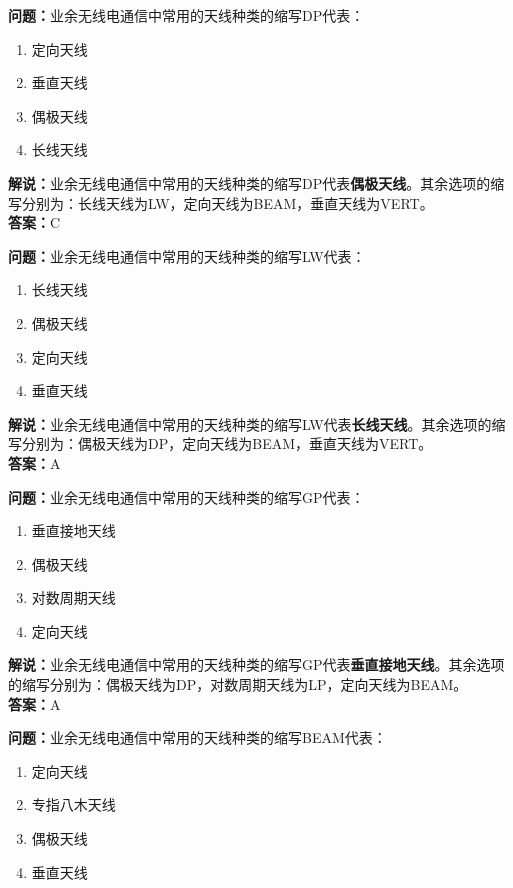 \bigskip


\noindent\textbf{问题：}业余无线电通信中常用的天线种类的缩写DP代表：
\begin{enumerate}[label=\Alph*), leftmargin=3em]
\item 定向天线
\item 垂直天线
\item 偶极天线
\item 长线天线
\end{enumerate}
\noindent\textbf{解说：}业余无线电通信中常用的天线种类的缩写DP代表\textbf{偶极天线}。其余选项的缩写分别为：长线天线为LW，定向天线为BEAM，垂直天线为VERT。\\\noindent\textbf{答案：}C



\bigskip


\noindent\textbf{问题：}业余无线电通信中常用的天线种类的缩写LW代表：
\begin{enumerate}[label=\Alph*), leftmargin=3em]
\item 长线天线
\item 偶极天线
\item 定向天线
\item 垂直天线
\end{enumerate}
\noindent\textbf{解说：}业余无线电通信中常用的天线种类的缩写LW代表\textbf{长线天线}。其余选项的缩写分别为：偶极天线为DP，定向天线为BEAM，垂直天线为VERT。\\\noindent\textbf{答案：}A



\bigskip


\noindent\textbf{问题：}业余无线电通信中常用的天线种类的缩写GP代表：
\begin{enumerate}[label=\Alph*), leftmargin=3em]
\item 垂直接地天线
\item 偶极天线
\item 对数周期天线
\item 定向天线
\end{enumerate}
\noindent\textbf{解说：}业余无线电通信中常用的天线种类的缩写GP代表\textbf{垂直接地天线}。其余选项的缩写分别为：偶极天线为DP，对数周期天线为LP，定向天线为BEAM。\\\noindent\textbf{答案：}A



\bigskip


\noindent\textbf{问题：}业余无线电通信中常用的天线种类的缩写BEAM代表：
\begin{enumerate}[label=\Alph*), leftmargin=3em]
\item 定向天线
\item 专指八木天线
\item 偶极天线
\item 垂直天线
\end{enumerate}

